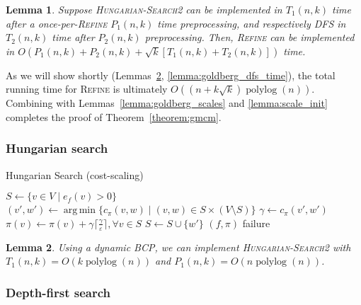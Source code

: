 \documentclass[11pt]{article}
\def\polylog{\mathop{\mathrm{polylog}}}
\def\eps{\varepsilon}
\DeclareMathOperator*{\argmin}{arg\,min}
\theoremstyle{plain}
\newtheorem{lemma}{Lemma}
\begin{document}
\begin{lemma}
	Suppose \textsc{Hungarian-Search2} can be implemented in $T_1(n, k)$ 
	time after a once-per-\textsc{Refine} $P_1(n, k)$ time preprocessing,
	and respectively \textsc{DFS} in $T_2(n, k)$ time after $P_2(n, k)$ 
	preprocessing.
	Then, \textsc{Refine} can be implemented in 
	$O(P_1(n, k) + P_2(n, k) + \sqrt{k}[T_1(n, k) + T_2(n, k)])$ time.
\end{lemma}

As we will show shortly (Lemmas~\ref{lemma:goldberg_hs_time}, 
\ref{lemma:goldberg_dfs_time}), the total running time for \textsc{Refine}
is ultimately $O((n + k\sqrt{k})\polylog(n))$.
Combining with Lemmas~\ref{lemma:goldberg_scales} and \ref{lemma:scale_init}
completes the proof of Theorem~\ref{theorem:gmcm}.

\subsubsection{Hungarian search}

\begin{algorithm}
\caption{Hungarian Search (cost-scaling)}
\begin{algorithmic}[1]
	\State $S \gets \{v \in V \mid e_f(v) > 0\}$
	\Repeat
		\State $(v', w') \gets \argmin\{c_\pi(v, w) \mid (v, w) \in S \times (V \setminus S)\}$
		\State $\gamma \gets c_\pi(v', w')$
			\State $\pi(v) \gets \pi(v) + \gamma\lceil\frac{\gamma}{\eps}\rceil, \forall v \in S$
		\EndIf
		\State $S \gets S \cup \{w'\}$
		\Statex %
		 
			\State\Return $(f, \pi)$
		\EndIf
	\State\Return failure
\EndFunction
\end{algorithmic}
\end{algorithm}


\begin{lemma}
\label{lemma:goldberg_hs_time}
	Using a dynamic BCP, we can implement \textsc{Hungarian-Search2} with 
	$T_1(n, k) = O(k\polylog(n))$ and $P_1(n, k) = O(n\polylog(n))$.
\end{lemma}


\subsubsection{Depth-first search}
\end{document}
